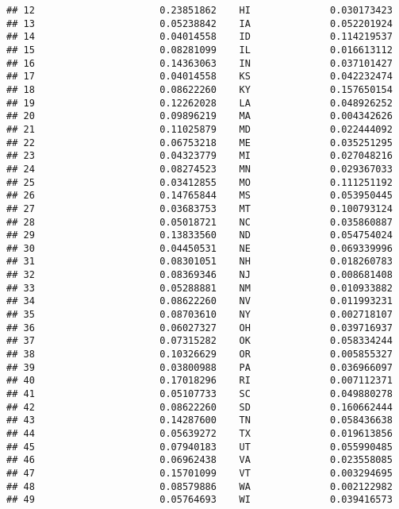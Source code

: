 \documentclass{article}\usepackage[]{graphicx}\usepackage[]{color}
\makeatletter
\newenvironment{kframe}{%
 \def\at@end@of@kframe{}%
 \ifinner\ifhmode%
  \def\at@end@of@kframe{\end{minipage}}%
  \begin{minipage}{\columnwidth}%
 \fi\fi%
 \def\FrameCommand##1{\hskip\@totalleftmargin \hskip-\fboxsep
 \colorbox{shadecolor}{##1}\hskip-\fboxsep
     \hskip-\linewidth \hskip-\@totalleftmargin \hskip\columnwidth}%
 \MakeFramed {\advance\hsize-\width
   \@totalleftmargin\z@ \linewidth\hsize
   \@setminipage}}%
 {\par\unskip\endMakeFramed%
 \at@end@of@kframe}
\newenvironment{knitrout}{}{} %
\makeatother
\begin{document}
\begin{knitrout}
\begin{kframe}
\begin{verbatim}
## 12                      0.23851862    HI              0.030173423
## 13                      0.05238842    IA              0.052201924
## 14                      0.04014558    ID              0.114219537
## 15                      0.08281099    IL              0.016613112
## 16                      0.14363063    IN              0.037101427
## 17                      0.04014558    KS              0.042232474
## 18                      0.08622260    KY              0.157650154
## 19                      0.12262028    LA              0.048926252
## 20                      0.09896219    MA              0.004342626
## 21                      0.11025879    MD              0.022444092
## 22                      0.06753218    ME              0.035251295
## 23                      0.04323779    MI              0.027048216
## 24                      0.08274523    MN              0.029367033
## 25                      0.03412855    MO              0.111251192
## 26                      0.14765844    MS              0.053950445
## 27                      0.03683753    MT              0.100793124
## 28                      0.05018721    NC              0.035860887
## 29                      0.13833560    ND              0.054754024
## 30                      0.04450531    NE              0.069339996
## 31                      0.08301051    NH              0.018260783
## 32                      0.08369346    NJ              0.008681408
## 33                      0.05288881    NM              0.010933882
## 34                      0.08622260    NV              0.011993231
## 35                      0.08703610    NY              0.002718107
## 36                      0.06027327    OH              0.039716937
## 37                      0.07315282    OK              0.058334244
## 38                      0.10326629    OR              0.005855327
## 39                      0.03800988    PA              0.036966097
## 40                      0.17018296    RI              0.007112371
## 41                      0.05107733    SC              0.049880278
## 42                      0.08622260    SD              0.160662444
## 43                      0.14287600    TN              0.058436638
## 44                      0.05639272    TX              0.019613856
## 45                      0.07940183    UT              0.055990485
## 46                      0.06962438    VA              0.023558085
## 47                      0.15701099    VT              0.003294695
## 48                      0.08579886    WA              0.002122982
## 49                      0.05764693    WI              0.039416573

\end{verbatim}
\end{kframe}
\end{knitrout}
\end{document}
